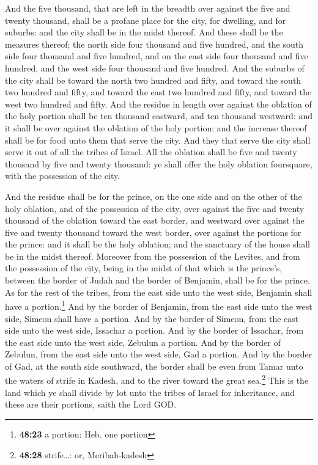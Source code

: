  And the five thousand, that are left in the breadth over
against the five and twenty thousand, shall be a profane place for the
city, for dwelling, and for suburbs: and the city shall be in the midst
thereof.  And these shall be the measures thereof; the
north side four thousand and five hundred, and the south side four
thousand and five hundred, and on the east side four thousand and five
hundred, and the west side four thousand and five hundred.
 And the suburbs of the city shall be toward the north
two hundred and fifty, and toward the south two hundred and fifty, and
toward the east two hundred and fifty, and toward the west two hundred
and fifty.  And the residue in length over against the
oblation of the holy portion shall be ten thousand eastward, and ten
thousand westward: and it shall be over against the oblation of the holy
portion; and the increase thereof shall be for food unto them that serve
the city.  And they that serve the city shall serve it
out of all the tribes of Israel.  All the oblation shall
be five and twenty thousand by five and twenty thousand: ye shall offer
the holy oblation foursquare, with the possession of the city.

 And the residue shall be for the prince, on the one side
and on the other of the holy oblation, and of the possession of the
city, over against the five and twenty thousand of the oblation toward
the east border, and westward over against the five and twenty thousand
toward the west border, over against the portions for the prince: and it
shall be the holy oblation; and the sanctuary of the house shall be in
the midst thereof.  Moreover from the possession of the
Levites, and from the possession of the city, being in the midst of that
which is the prince's, between the border of Judah and the border of
Benjamin, shall be for the prince.  As for the rest of
the tribes, from the east side unto the west side, Benjamin shall have a
portion.\footnote{\textbf{48:23} a portion: Heb. one portion}
 And by the border of Benjamin, from the east side unto
the west side, Simeon shall have a portion.  And by the
border of Simeon, from the east side unto the west side, Issachar a
portion.  And by the border of Issachar, from the east
side unto the west side, Zebulun a portion.  And by the
border of Zebulun, from the east side unto the west side, Gad a portion.
 And by the border of Gad, at the south side southward,
the border shall be even from Tamar unto the waters of strife in Kadesh,
and to the river toward the great sea.\footnote{\textbf{48:28}
  strife\ldots: or, Meribah-kadesh}  This is the land
which ye shall divide by lot unto the tribes of Israel for inheritance,
and these are their portions, saith the Lord GOD.


